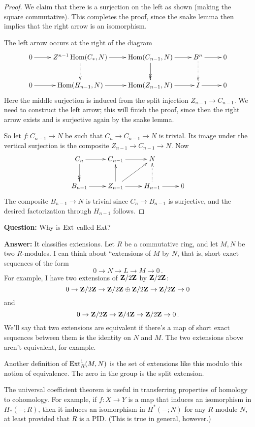 \begin{proof}
We claim that there is a surjection on the left as shown (making the square
commutative). This completes the proof, since the snake lemma then implies
that the right arrow is an isomorphism.

The left arrow occurs at the right of the diagram
\[
\xymatrix{
0 \ar[r] & Z^{n-1}\Hom(C_*,N) \ar@{.>}[d] \ar[r] & 
\Hom(C_{n-1},N) \ar@{->>}[d] \ar[r] & B^n \ar@{.>}[d] \ar[r] & 0 \\
0 \ar[r] & \Hom(H_{n-1},N) \ar[r] & \Hom(Z_{n-1},N) \ar[r] & I \ar[r] & 0 
}\]
Here the middle surjection is induced from the split injection 
$Z_{n-1}\to C_{n-1}$. We need to construct the left arrow; this will
finish the proof, since then the right arrow exists and is surjective again by
the snake lemma. 

So let $f:C_{n-1}\to N$ be such that $C_n\to C_{n-1}\to N$ is trivial. Its 
image under the vertical surjection is the composite $Z_{n-1}\to C_{n-1}\to N$.
Now 
\[
\xymatrix{
C_n \ar@{->>}[d] \ar[r] & C_{n-1} \ar[r] & N \\
B_{n-1} \ar[r] & Z_{n-1} \ar[u] \ar[ur] \ar[r] & H_{n-1} \ar@{.>}[u] \ar[r] & 0 
}\]
The composite $B_{n-1}\to N$ is trivial since $C_n\to B_{n-1}$ is surjective,
and the desired factorization through $H_{n-1}$ follows. 
\end{proof}

\begin{remark}
\textbf{Question:} Why is $\operatorname{Ext}$ called Ext?

\noindent
\textbf{Answer:} It classifies extensions. Let $R$ be a commutative ring, and let $M,N$ be two $R$-modules. I can think about ``extensions of $M$ by $N$, that is, short exact sequences of the form
\[
0\to N\to L\to M\to 0\,.
\]
For example, I have two extensions of $\mathbf Z/2\mathbf Z$ by $\mathbf Z/2\mathbf Z$: 
\[
0\to\mathbf Z/2\mathbf Z\to\mathbf Z/2\mathbf Z\oplus\mathbf Z/2\mathbf Z\to\mathbf Z/2\mathbf Z\to 0
\]
and
\[0\to \mathbf Z/2\mathbf Z\to\mathbf Z/4\mathbf Z\to\mathbf Z/2\mathbf Z\to 0\,.
\]
We'll say that two extensions are equivalent if there's a map of short exact sequences between them is the identity on $N$ and $M$. The two extensions above aren't equivalent, for example.

Another definition of $\operatorname{Ext}^1_R(M,N)$ is the set of extensions like this modulo this notion of equivalence. The zero in the group is the split extension.
\end{remark}

The universal coefficient theorem is useful in transferring properties of 
homology to cohomology. For example, if $f:X\to Y$ is a map that induces an
isomorphism in $H_*(-;R)$, then it induces an isomorphism in $H^*(-;N)$ for
any $R$-module $N$, at least provided that $R$ is a PID. (This is true in 
general, however.) 

